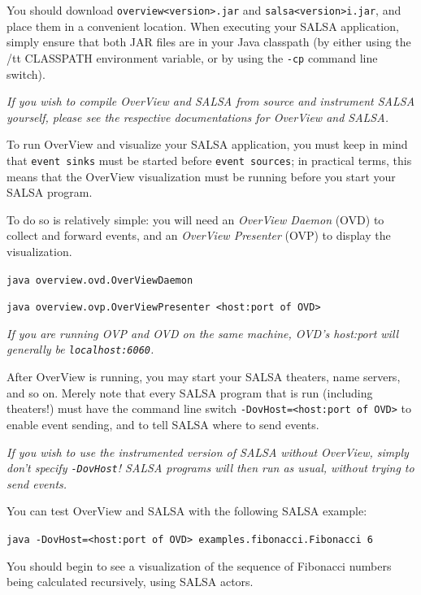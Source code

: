 You should download {\tt overview<version>.jar} and {\tt salsa<version>i.jar}, and place them in a convenient location. When executing your SALSA application, simply ensure that both JAR files are in your Java classpath (by either using the {/tt CLASSPATH} environment variable, or by using the {\tt -cp} command line switch).

\emph{If you wish to compile OverView and SALSA from source and instrument SALSA yourself, please see the respective documentations for OverView and SALSA.}

To run OverView and visualize your SALSA application, you must keep in mind that {\tt event sinks} must be started before {\tt event sources}; in practical terms, this means that the OverView visualization must be running before you start your SALSA program.

To do so is relatively simple: you will need an {\it OverView Daemon} (OVD) to collect and forward events, and an {\it OverView Presenter} (OVP) to display the visualization.

\begin{description}
  \item{\tt java overview.ovd.OverViewDaemon}
  \item{\tt java overview.ovp.OverViewPresenter <host:port of OVD>}
\end{description}

\emph{If you are running OVP and OVD on the same machine, OVD's host:port will generally be {\tt localhost:6060}.}

After OverView is running, you may start your SALSA theaters, name servers, and so on. Merely note that every SALSA program that is run (including theaters!) must have the command line switch {\tt -DovHost=<host:port of OVD>} to enable event sending, and to tell SALSA where to send events.

\emph{If you wish to use the instrumented version of SALSA without OverView, simply don't specify {\tt -DovHost}! SALSA programs will then run as usual, without trying to send events.}
 
You can test OverView and SALSA with the following SALSA example:
{\sloppy
\begin{description}
  \item{\tt java -DovHost=<host:port of OVD> examples.fibonacci.Fibonacci 6}
\end{description}
}

You should begin to see a visualization of the sequence of Fibonacci numbers being calculated recursively, using SALSA actors.

